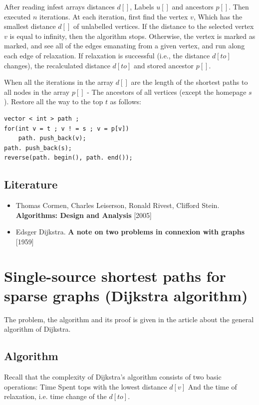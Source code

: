 After reading infest arrays distances $d []$, Labels $u []$ and ancestors $p []$. Then executed $n$ iterations. At each iteration, first find the vertex $v$, Which has the smallest distance $d []$ of unlabelled vertices. If the distance to the selected vertex $v$ is equal to infinity, then the algorithm stops. Otherwise, the vertex is marked as marked, and see all of the edges emanating from a given vertex, and run along each edge of relaxation. If relaxation is successful (i.e., the distance $d [to]$ changes), the recalculated distance $d [to]$ and stored ancestor $p []$.

When all the iterations in the array $d []$ are the length of the shortest paths to all nodes in the array $p []$ - The ancestors of all vertices (except the homepage $s$ ). Restore all the way to the top $t$ as follows:
\begin{verbatim}
vector < int > path ;
for(int v = t ; v ! = s ; v = p[v])
    path. push_back(v);
path. push_back(s);
reverse(path. begin(), path. end()); 
\end{verbatim}
\subsection{ Literature }

\begin{itemize} \item Thomas Cormen, Charles Leiserson, Ronald Rivest, Clifford Stein. \textbf{Algorithms: Design and Analysis} [2005] \item Edsger Dijkstra. \textbf{A note on two problems in connexion with graphs} [1959] \end{itemize}

\section{ Single-source shortest paths for sparse graphs (Dijkstra algorithm) }
The problem, the algorithm and its proof is given in the article about the general algorithm of Dijkstra.

\subsection{ Algorithm }

Recall that the complexity of Dijkstra's algorithm consists of two basic operations: Time Spent tops with the lowest distance $d [v]$ And the time of relaxation, i.e. time change of the $d [to]$.

